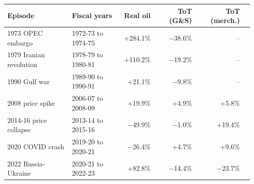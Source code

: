 \begin{tabular}{llrrrr}
\toprule
Episode & Fiscal years & Real oil & ToT (G\&S) & ToT (merch.) \\
\midrule
1973 OPEC embargo & 1972-73 to 1974-75 & +284.1\% & $-$38.6\% & -- \\
1979 Iranian revolution & 1978-79 to 1980-81 & +110.2\% & $-$19.2\% & -- \\
1990 Gulf war & 1989-90 to 1990-91 & +21.1\% & $-$9.8\% & -- \\
2008 price spike & 2006-07 to 2008-09 & +19.9\% & +4.9\% & +5.8\% \\
2014-16 price collapse & 2013-14 to 2015-16 & $-$49.9\% & $-$1.0\% & +19.4\% \\
2020 COVID crash & 2019-20 to 2020-21 & $-$26.4\% & +4.7\% & +9.6\% \\
2022 Russia-Ukraine & 2020-21 to 2022-23 & +82.8\% & $-$14.4\% & $-$23.7\% \\
\bottomrule
\end{tabular}
